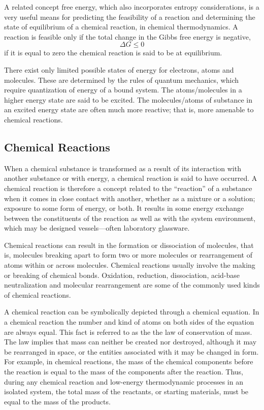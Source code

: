 A related concept free energy, which also incorporates entropy considerations, is a very useful means for predicting the feasibility of a reaction and determining the state of equilibrium of a chemical reaction, in chemical thermodynamics. A reaction is feasible only if the total change in the Gibbs free energy is negative, \[ \Delta G \leq 0 \] if it is equal to zero the chemical reaction is said to be at equilibrium.

There exist only limited possible states of energy for electrons, atoms and molecules. These are determined by the rules of quantum mechanics, which require quantization of energy of a bound system. The atoms/molecules in a higher energy state are said to be excited. The molecules/atoms of substance in an excited energy state are often much more reactive; that is, more amenable to chemical reactions.

\hypertarget{chemical-reactions}{%
\subsection{Chemical Reactions}\label{chemical-reactions}}

When a chemical substance is transformed as a result of its interaction
with another substance or with energy, a chemical reaction is said to
have occurred. A chemical reaction is therefore a concept related to the
``reaction'' of a substance when it comes in close contact with another,
whether as a mixture or a solution; exposure to some form of energy, or
both. It results in some energy exchange between the constituents of the
reaction as well as with the system environment, which may be designed
vessels---often laboratory glassware.

Chemical reactions can result in the formation or dissociation of
molecules, that is, molecules breaking apart to form two or more
molecules or rearrangement of atoms within or across molecules. Chemical
reactions usually involve the making or breaking of chemical bonds.
Oxidation, reduction, dissociation, acid-base neutralization and
molecular rearrangement are some of the commonly used kinds of chemical
reactions.

A chemical reaction can be symbolically depicted through a chemical
equation. In a chemical reaction the number and kind of atoms on both
sides of the equation are always equal. This fact is referred to as the
the law of conservation of mass. The law implies that mass can neither
be created nor destroyed, although it may be rearranged in space, or the
entities associated with it may be changed in form. For example, in
chemical reactions, the mass of the chemical components before the
reaction is equal to the mass of the components after the reaction.
Thus, during any chemical reaction and low-energy thermodynamic
processes in an isolated system, the total mass of the reactants, or
starting materials, must be equal to the mass of the products.

